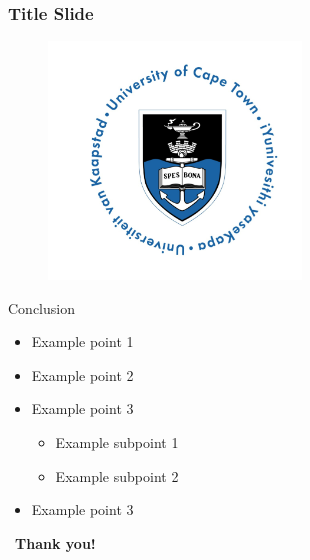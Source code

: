 \documentclass[xcolor=dvipsnames,10pt]{beamer}
\begin{document}

\begin{frame}
	\frametitle{Title Slide}
	\begin{figure}[h]
		\begin{center}
			\includegraphics[width=0.6\textwidth]{Figures/uct.png}
		\end{center}
	\end{figure}
\end{frame}


\begin{frame}{Conclusion}
	\begin{itemize}\itemsep15pt
		\item Example point 1
		\item  Example point 2
		\item  Example point 3
		\begin{itemize}\itemsep5pt
			\item  Example subpoint 1
			\item Example subpoint 2
		\end{itemize}
		\item Example  point 3
	\end{itemize}
	\pause
	~\hfill {\bf Thank you!}
\end{frame}

%
\end{document}
